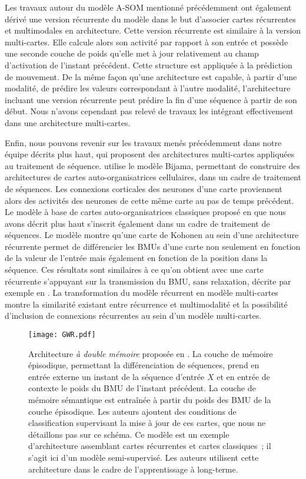 \documentclass[../main]{subfiles}
\begin{document}
Les travaux autour du modèle A-SOM mentionné précédemment ont également dérivé une version récurrente du modèle \parencite{Buonamente2015DiscriminatingAS} dans le but d'associer cartes récurrentes et multimodales en architecture.
Cette version récurrente est similaire à la version multi-cartes. Elle calcule alors son activité par rapport à son entrée et possède une seconde couche de poids qu'elle met à jour relativement au champ d'activation de l'instant précédent.
Cette structure est appliquée à la prédiction de mouvement. De la même façon qu'une architecture est capable, à partir d'une modalité, de prédire les valeurs correspondant à l'autre modalité, l'architecture incluant une version récurrente peut prédire la fin d'une séquence à partir de son début.
Nous n'avons cependant pas relevé de travaux les intégrant effectivement dans une architecture multi-cartes.

Enfin, nous pouvons revenir sur les travaux menés précédemment dans notre équipe décrits plus haut, qui proposent des architectures multi-cartes appliquées au traitement de séquence.
\cite{khouzam_neural_2014} utilise le modèle Bijama, permettant de construire des architectures de cartes auto-organisatrices cellulaires, dans un cadre de traitement de séquences.
Les connexions corticales des neurones d'une carte proviennent alors des activités des neurones de cette même carte au pas de temps précédent.
Le modèle à base de cartes auto-organisatrices classiques proposé en \cite{baheux_towards_2014} que nous avons décrit plus haut s'inscrit également dans un cadre de traitement de séquences. Le modèle montre qu'une carte de Kohonen au sein d'une architecture récurrente permet de différencier les BMUs d'une carte non seulement en fonction de la valeur de l'entrée mais également en fonction de la position dans la séquence. Ces résultats sont similaires à ce qu'on obtient avec une carte récurrente s'appuyant sur la transmission du BMU, sans relaxation, décrite par exemple en \cite{fix20}. La transformation du modèle récurrent en modèle multi-cartes montre la similarité existant entre récurrence et multimodalité et la possibilité d'inclusion de connexions récurrentes au sein d'un modèle multi-cartes.


\begin{figure}
    \centering
    \texttt{[image: GWR.pdf]}
    \caption{Architecture \emph{à double mémoire} proposée en \cite{parisiLL}. 
    La couche de mémoire épisodique, permettant la différenciation de séquences, prend en entrée externe un instant de la séquence d'entrée $X$ et en entrée de contexte le poids du BMU de l'instant précédent.
    La couche de mémoire sémantique est entraînée à partir du poids des BMU de la couche épisodique. Les auteurs ajoutent des conditions de classification supervisant la mise à jour de ces cartes, que nous ne détaillons pas sur ce schéma. Ce modèle est un exemple d'architecture assemblant cartes récurrentes et cartes classiques~; il s'agit ici d'un modèle semi-supervisé. Les auteurs utilisent cette architecture dans le cadre de l'apprentissage à long-terme.\label{fig:parisi}}
\end{figure}
\end{document}
